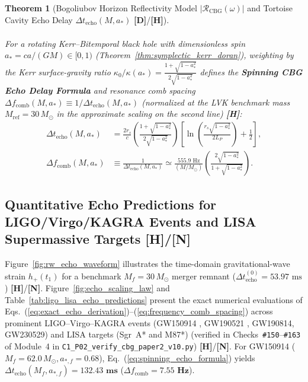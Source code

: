 \documentclass[11pt,a4paper]{article}
\newcommand{\catD}{\textbf{\textcolor{blue!75!black}{[D]}}}
\newcommand{\catH}{\textbf{\textcolor{orange!85!black}{[H]}}}
\newcommand{\catN}{\textbf{\textcolor{teal!75!black}{[N]}}}
\theoremstyle{plain}
\newtheorem{theorem}{Theorem}[section]
\theoremstyle{definition}
\theoremstyle{remark}
\numberwithin{equation}{section}
\begin{document}
\begin{theorem}[Bogoliubov Horizon Reflectivity Model $|\mathcal{R}_{\text{CBG}}(\omega)|$ and Tortoise Cavity Echo Delay $\Delta t_{\text{echo}}(M, a_*)$ \catD/\catH]
\begin{enumerate}
\begin{align}
    \label{eq:exact_echo_derivation}
  \end{align}
  For a rotating Kerr--Bitemporal black hole with dimensionless spin $a_* = c a / (GM) \in [0, 1)$ (Theorem~\ref{thm:symplectic_kerr_doran}), weighting by the Kerr surface-gravity ratio $\kappa_0 / \kappa(a_*) = \frac{1 + \sqrt{1 - a_*^2}}{2\sqrt{1 - a_*^2}}$ defines the \textbf{Spinning CBG Echo Delay Formula} and resonance comb spacing $\Delta f_{\text{comb}}(M, a_*) \equiv 1/\Delta t_{\text{echo}}(M, a_*)$ (normalized at the LVK benchmark mass $M_{\text{ref}} = 30\,M_\odot$ in the approximate scaling on the second line) \catH:
  \begin{align}
    \Delta t_{\text{echo}}\left(M, a_*\right) &= \frac{2 r_s}{c} \left( \frac{1 + \sqrt{1 - a_*^2}}{2\sqrt{1 - a_*^2}} \right) \left[ \ln\left(\frac{r_s \sqrt{1 - a_*^2}}{2 L_P}\right) + \frac{1}{2} \right], \label{eq:spinning_echo_formula} \\[4pt]
    \Delta f_{\text{comb}}\left(M, a_*\right) &\equiv \frac{1}{\Delta t_{\text{echo}}\left(M, a_*\right)} \simeq \frac{555.9\text{ Hz}}{\left(M / M_\odot\right)} \left(\frac{2\sqrt{1 - a_*^2}}{1 + \sqrt{1 - a_*^2}}\right).
    \label{eq:frequency_comb_spacing}
  \end{align}
\end{enumerate}
\end{theorem}

\subsection{\texorpdfstring{Quantitative Echo Predictions for LIGO/Virgo/KAGRA Events and LISA Supermassive Targets \catH/\catN}{Quantitative Echo Predictions for LIGO/Virgo/KAGRA Events and LISA Supermassive Targets}}

Figure~\ref{fig:rw_echo_waveform} illustrates the time-domain gravitational-wave strain $h_+(t_1)$ for a benchmark $M_f = 30\,M_\odot$ merger remnant ($\Delta t_{\text{echo}}^{(0)} = 53.97\text{ ms}$) \catH/\catN. Figure~\ref{fig:echo_scaling_law} and Table~\ref{tab:ligo_lisa_echo_predictions} present the exact numerical evaluations of Eqs.~(\ref{eq:exact_echo_derivation})--(\ref{eq:frequency_comb_spacing}) across prominent LIGO--Virgo--KAGRA events (GW150914 \cite{ligo2016}, GW190521 \cite{abbott2020_gw190521}, GW190814, GW230529) and LISA targets (Sgr~A* and M87*) \cite{amaro2017} (verified in Checks~\texttt{\#150}--\texttt{\#163} of Module~4 in \allowbreak\texttt{C1\_P02\_verify\_cbg\_paper2\_v10.py}) \catH/\catN. For GW150914 ($M_f = 62.0\,M_\odot, a_{*,f} = 0.68$), Eq.~(\ref{eq:spinning_echo_formula}) yields $\Delta t_{\text{echo}}(M_f, a_{*,f}) = \mathbf{132.43\text{ ms}}$ ($\Delta f_{\text{comb}} = \mathbf{7.55\text{ Hz}}$).
\end{document}
